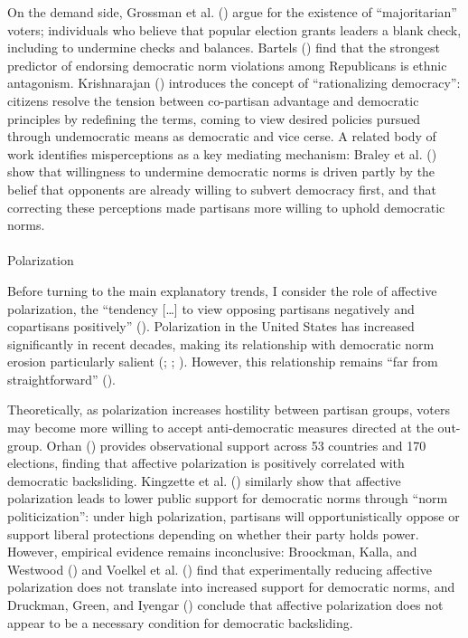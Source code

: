 \documentclass[
  10pt,
  letterpaper,
  DIV=11,
  numbers=noendperiod]{scrartcl}
\makeatletter
\let\oldparagraph\paragraph
\renewcommand{\paragraph}{
    \@ifstar
      \xxxParagraphStar
      \xxxParagraphNoStar
  }
\newcommand{\xxxParagraphStar}[1]{\oldparagraph*{#1}\mbox{}}
\newcommand{\xxxParagraphNoStar}[1]{\oldparagraph{#1}\mbox{}}
\makeatother
\begin{document}
On the demand side, Grossman et al. ()
argue for the existence of ``majoritarian'' voters; individuals who
believe that popular election grants leaders a blank check, including to
undermine checks and balances. Bartels
() find that the strongest predictor of
endorsing democratic norm violations among Republicans is ethnic
antagonism. Krishnarajan ()
introduces the concept of ``rationalizing democracy'': citizens resolve
the tension between co-partisan advantage and democratic principles by
redefining the terms, coming to view desired policies pursued through
undemocratic means as democratic and vice cerse. A related body of work
identifies misperceptions as a key mediating mechanism: Braley et al.
() show that willingness to undermine
democratic norms is driven partly by the belief that opponents are
already willing to subvert democracy first, and that correcting these
perceptions made partisans more willing to uphold democratic norms.

\paragraph{Polarization}\label{polarization}

Before turning to the main explanatory trends, I consider the role of
affective polarization, the ``tendency {[}\ldots{]} to view opposing
partisans negatively and copartisans positively''
().
Polarization in the United States has increased significantly in recent
decades, making its relationship with democratic norm erosion
particularly salient (; ;
). However, this relationship
remains ``far from straightforward''
().

Theoretically, as polarization increases hostility between partisan
groups, voters may become more willing to accept anti-democratic
measures directed at the out-group. Orhan
() provides observational support across
53 countries and 170 elections, finding that affective polarization is
positively correlated with democratic backsliding. Kingzette et al.
() similarly show that affective
polarization leads to lower public support for democratic norms through
``norm politicization'': under high polarization, partisans will
opportunistically oppose or support liberal protections depending on
whether their party holds power. However, empirical evidence remains
inconclusive: Broockman, Kalla, and Westwood
() and Voelkel et al.
() find that experimentally reducing
affective polarization does not translate into increased support for
democratic norms, and Druckman, Green, and Iyengar
() conclude that affective polarization
does not appear to be a necessary condition for democratic backsliding.
\end{document}
